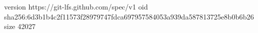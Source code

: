 version https://git-lfs.github.com/spec/v1
oid sha256:6d3b1b4c2f11573f28979747fdca697957584053a939da587813725e8b0b6b26
size 42027
